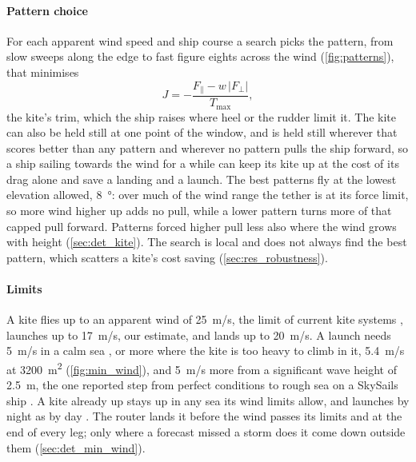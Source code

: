 \paragraph{Pattern choice} For each apparent wind speed and ship course a search picks the pattern, from slow sweeps along the edge to fast figure eights across the wind (\cref{fig:patterns}), that minimises
\begin{equation}
J = -\frac{F_\parallel - w\,|F_\perp|}{T_\mathrm{max}},
\label{eq:pattern_objective}
\end{equation}
 the kite's trim, which the ship raises where heel or the rudder limit it. The kite can also be held still at one point of the window, and is held still wherever that scores better than any pattern and wherever no pattern pulls the ship forward, so a ship sailing towards the wind for a while can keep its kite up at the cost of its drag alone and save a landing and a launch. The best patterns fly at the lowest elevation allowed, \SI{8}{\degree}: over much of the wind range the tether is at its force limit, so more wind higher up adds no pull, while a lower pattern turns more of that capped pull forward. Patterns forced higher pull less also where the wind grows with height (\cref{sec:det_kite}). The search is local and does not always find the best pattern, which scatters a kite's cost saving (\cref{sec:res_robustness}).

\paragraph{Limits}\label{sec:min_wind} A kite flies up to an apparent wind of \SI{25}{m/s}, the limit of current kite systems , launches up to \SI{17}{m/s}, our estimate, and lands up to \SI{20}{m/s}. A launch needs \SI{5}{m/s} in a calm sea \citep{skypower100_tib,paulig2013,noaa2009}, or more where the kite is too heavy to climb in it, \SI{5.4}{m/s} at \SI{3200}{m^2} (\cref{fig:min_wind}), and \SI{5}{m/s} more from a significant wave height of \SI{2.5}{m}, the one reported step from perfect conditions to rough sea on a SkySails ship \citep{paulig2013}. A kite already up stays up in any sea its wind limits allow, and launches by night as by day \citep{skypower100_tib}. The router lands it before the wind passes its limits and at the end of every leg; only where a forecast missed a storm does it come down outside them (\cref{sec:det_min_wind}).

